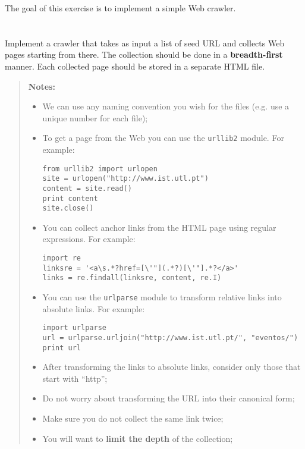 \documentclass[12pt]{article}
\begin{document}

The goal of this exercise is to implement a simple Web crawler.

\section{}

Implement a crawler that takes as input a list of seed URL and collects Web
pages starting from there. The collection should be done in a
\textbf{breadth-first} manner. Each collected page should be stored in a
separate HTML file.

\begin{quote}
    \textbf{Notes:}
    \begin{itemize}
    \item We can use any naming convention you wish for the files (e.g. use a
        unique number for each file);
    \item To get a page from the Web you can use the \texttt{urllib2}
        module. For example:
\begin{verbatim}
from urllib2 import urlopen
site = urlopen("http://www.ist.utl.pt")
content = site.read()
print content
site.close()
\end{verbatim}
    \item You can collect anchor links from the HTML page using regular
        expressions. For example:
\begin{verbatim}
import re
linksre = '<a\s.*?href=[\'"](.*?)[\'"].*?</a>'
links = re.findall(linksre, content, re.I)
\end{verbatim}
    \item You can use the \texttt{urlparse} module to transform relative links
        into absolute links. For example:
\begin{verbatim}
import urlparse
url = urlparse.urljoin("http://www.ist.utl.pt/", "eventos/")
print url
\end{verbatim}
    \item After transforming the links to absolute links, consider only those
        that start with ``http'';
    \item Do not worry about transforming the URL into their canonical form;
    \item Make sure you do not collect the same link twice;
    \item You will want to \textbf{limit the depth} of the collection;

\end{itemize}
\end{quote}
\end{document}
